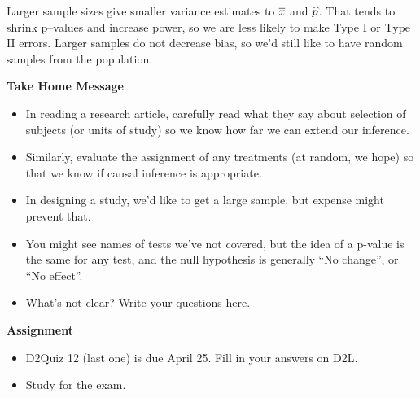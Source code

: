 \begin{enumerate}
\begin{students}
 \vspace{4cm}
\end{students}

\begin{key}
   Larger sample sizes give smaller variance estimates to $\overline{x}$ and
   $\widehat{p}$.  That tends to shrink p--values and increase power, so we
   are less likely to make Type I or Type II errors. Larger samples do
   not decrease bias, so we'd still like to have random samples from
   the population.
\end{key}


\end{enumerate}


\begin{center}
  {\large\bf Take Home Message}
\end{center}

\begin{itemize}
\item  In reading a research article, carefully read what they say
  about selection of subjects (or units of study) so we know how far
  we can extend our inference.
\item Similarly, evaluate the assignment of any treatments (at random,
  we hope) so that we know if causal inference is appropriate.
\item In designing a study, we'd like to get a large sample, but
  expense might prevent that.
\item You might see names of tests we've not covered, but the idea of
  a p-value is the same for any test, and the null hypothesis is
  generally ``No change'', or ``No effect''.
\item What's not clear?  Write your questions here.
  \vfill
\end{itemize}


\begin{center}
  {\large\bf Assignment}
\end{center}

\begin{itemize}
\item D2Quiz 12 (last one) is due April 25.  Fill in your answers on D2L.
\item Study for the exam.
\end{itemize}



